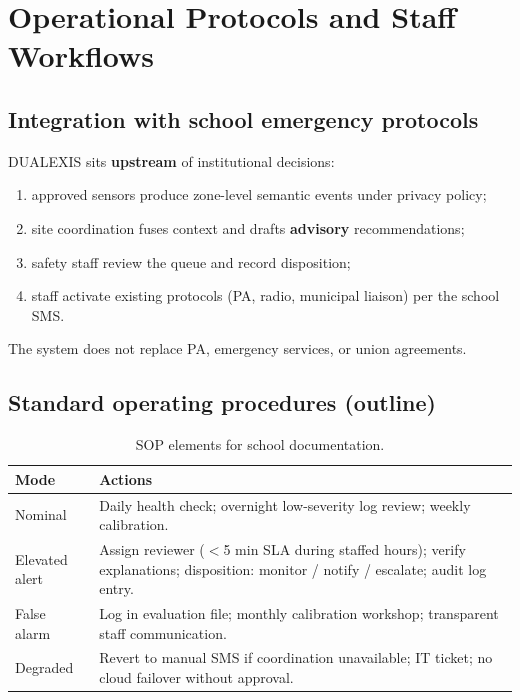 \section{Operational Protocols and Staff Workflows}
\label{sec:operational-protocols}

\subsection{Integration with school emergency protocols}

DUALEXIS sits \textbf{upstream} of institutional decisions:
\begin{enumerate}[noitemsep]
  \item approved sensors produce zone-level semantic events under privacy policy;
  \item site coordination fuses context and drafts \textbf{advisory} recommendations;
  \item safety staff review the queue and record disposition;
  \item staff activate existing protocols (PA, radio, municipal liaison) per the school SMS.
\end{enumerate}

The system does not replace PA, emergency services, or union agreements.

\subsection{Standard operating procedures (outline)}

\begin{table}[htbp]
  \centering
  \caption{SOP elements for school documentation.}
  \label{tab:sop-outline}
  \small
  \begin{tabular}{@{}p{2.6cm}p{8.4cm}@{}}
    \toprule
    Mode & Actions \\
    \midrule
    Nominal &
      Daily health check; overnight low-severity log review; weekly calibration. \\
    Elevated alert &
      Assign reviewer ($<$5 min SLA during staffed hours); verify explanations;
      disposition: monitor / notify / escalate; audit log entry. \\
    False alarm &
      Log in evaluation file; monthly calibration workshop; transparent staff communication. \\
    Degraded &
      Revert to manual SMS if coordination unavailable; IT ticket; no cloud failover without approval. \\
    \bottomrule
  \end{tabular}
\end{table}

